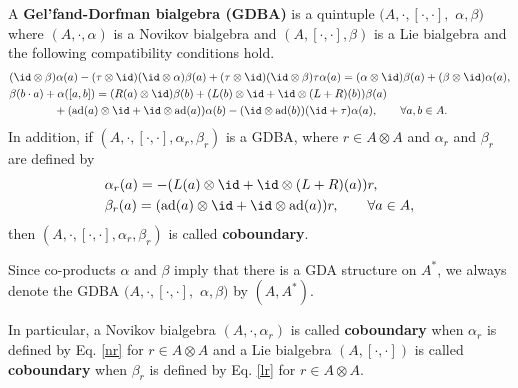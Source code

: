 \documentclass[12pt]{amsart}
\begin{document}
\begin{definition}\cite{HBG}
    A {\bf  Gel'fand-Dorfman bialgebra (GDBA)} is a quintuple $(A,\cdot,[\cdot,\cdot],$ $\alpha,\beta)$  where $(A,\cdot, \alpha)$ is a Novikov bialgebra and  $(A,[\cdot,\cdot],\beta)$ is a Lie bialgebra and
    the following compatibility conditions hold.
    \begin{align*}
        &(\id\otimes \beta)\alpha(a)-(\tau\otimes \id)(\id\otimes \alpha)\beta(a)+(\tau\otimes\id)(\id\otimes \beta)\tau\alpha(a)=(\alpha\otimes \id)\beta(a)+(\beta\otimes \id)\alpha(a),\\
        &\beta(b\cdot a )+\alpha([a,b])=( R(a)\otimes \id)\beta(b)+(L(b)\otimes \id+ \id\otimes (L+R)(b))\beta(a)\\
        &\qquad\qquad+({\rm ad}(a)\otimes \id+\id\otimes {\rm ad}(a))\alpha(b)-(\id\otimes {\rm ad}(b))(\id+\tau)\alpha(a),\qquad  \forall a,b\in A.\nonumber
    \end{align*}
    In addition, if  $(A,\cdot,[\cdot,\cdot],\alpha_r,\beta_r)$ is a GDBA, where $r\in A\otimes A$ and $\alpha_r$ and $\beta_r$ are defined by
    \begin{align}
        \label{nr}&\alpha_r(a)=-(L(a)\otimes \id+\id\otimes (L+R)(a))r,\\
        \label{lr}& \beta_r(a)=({\rm ad}(a)\otimes \id+\id\otimes {\rm ad}(a))r, \qquad \forall a\in A,
    \end{align}
    then $(A,\cdot,[\cdot,\cdot],\alpha_r,\beta_r)$ is called {\bf coboundary}.
\end{definition}
\begin{remark}
    Since co-products  $\alpha$ and $\beta$ imply that there is a GDA structure on $A^*$, we always denote the GDBA $(A,\cdot,[\cdot,\cdot],$ $\alpha,\beta)$ by $(A,A^*)$.
\end{remark}
In particular, a  Novikov bialgebra $(A,\cdot, \alpha_r)$  is called {\bf coboundary} when $\alpha_r$ is defined by  Eq. \eqref{nr} for
$r\in A\otimes A$ and a Lie bialgebra $(A,[\cdot,\cdot])$ is called {\bf coboundary} when $\beta_r$ is defined by Eq. \eqref{lr} for $r\in A\otimes A$.
\end{document}

